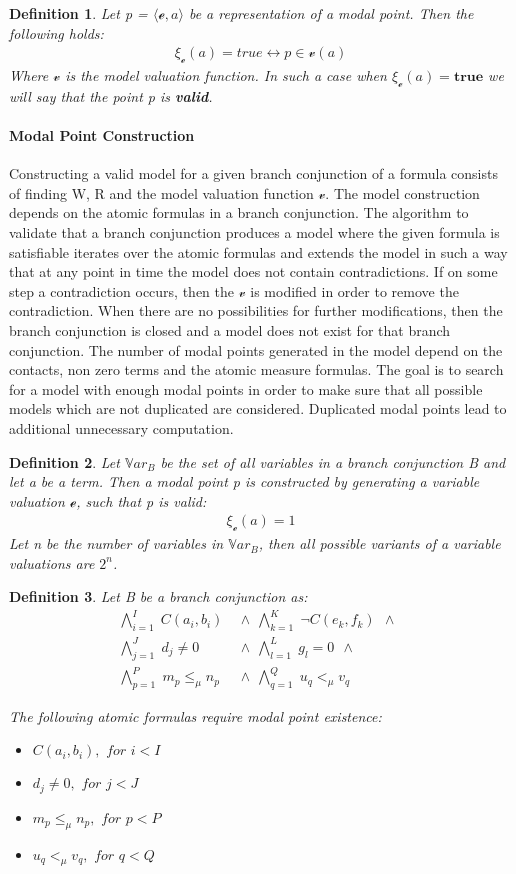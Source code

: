 \documentclass{article}
\newtheorem{defn}{Definition}[section]
\newcommand{\curvedE}{\mathscr{e}}
\newcommand{\Var}{\mathbb{V}ar}
\newcommand{\vE}{\mathscr{v}}
\newcommand{\vBool}{\xi}
\newcommand{\BranchConjunction}{%
\begin{align*}
			\bigwedge_{i=1}^{I} \; C(a_i, b_i) \:\: & \wedge \:\: 
			\bigwedge_{k=1}^{K} \; \neg C(e_k, f_k) \:\: \wedge \:\: \\
			\bigwedge_{j=1}^{J} \; d_j \neq 0 \:\: & \wedge \:\:
			\bigwedge_{l=1}^{L} \; g_l = 0 \:\: \wedge \:\:\\
			\bigwedge_{p=1}^{P} \; m_p \le_\mu n_p \:\: &\wedge \:\:
			\bigwedge_{q=1}^{Q} \; u_q <_\mu v_q \:\:
\end{align*}%
}
\begin{document}
	\begin{defn}
		Let p = $\langle \curvedE, a\rangle$ be a representation of a modal point. Then the following holds:
		\begin{align*}
			\vBool_{\curvedE}(a) = true \leftrightarrow p \in \vE(a)
		\end{align*}
		Where $\vE$ is the model valuation function. In such a case when $\vBool_{\curvedE}(a) = \textbf{true}$ we will say that the point p is \textbf{valid}.
	\end{defn}
	
	\paragraph{Modal Point Construction}
		Constructing a valid model for a given branch conjunction of a formula consists of finding W, R and the model valuation function $\vE$.
		The model construction depends on the atomic formulas in a branch conjunction. 
		The algorithm to validate that a branch conjunction produces a model where the given formula is satisfiable iterates over the atomic formulas and extends the model in such a way that at any point in time the model does not contain contradictions.
		If on some step a contradiction occurs, then the $\vE$ is modified in order to remove the contradiction.
		When there are no possibilities for further modifications, then the branch conjunction is closed and a model does not exist for that branch conjunction.
		The number of modal points generated in the model depend on the contacts, non zero terms and the atomic measure formulas.
		The goal is to search for a model with enough modal points in order to make sure that all possible models which are not duplicated are considered.
		Duplicated modal points lead to additional unnecessary computation. 

	\begin{defn}
		Let $\Var_B$ be the set of all variables in a branch conjunction B and let a be a term.
		Then a modal point p is constructed by generating a variable valuation $\curvedE$, such that p is valid:
		\begin{align*}
			\vBool_{\curvedE}(a) = 1
		\end{align*}
		Let n be the number of variables in $\Var_B$, then all possible variants of a variable valuations are $2^n$.
	\end{defn}

	\begin{defn}
		Let B be a branch conjunction as:
		\BranchConjunction
		The following atomic formulas require modal point existence:
		\begin{itemize}
			\item $C(a_i, b_i), \textit{ for } i < I$
			\item $d_j \neq 0, \textit{ for } j < J$
			\item $m_p \le_\mu n_p, \textit{ for } p < P$
			\item $u_q <_\mu v_q, \textit{ for } q < Q$
		\end{itemize}
	\end{defn}
\end{document}
